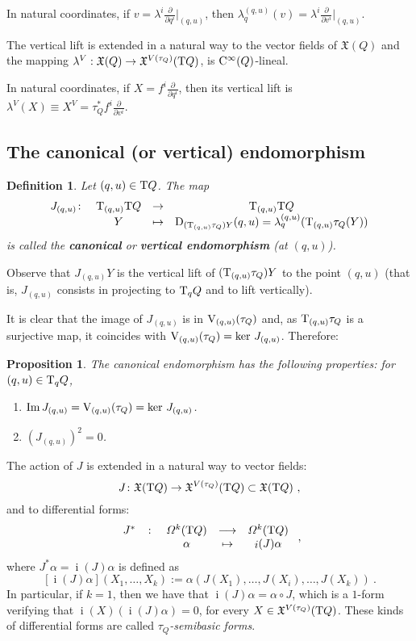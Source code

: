 \documentclass[12pt]{report}
\newtheorem{prop}[teor]{Proposition}
\newtheorem{definition}[teor]{Definition}
\def\ben{\begin{enumerate}}
\def\een{\end{enumerate}}
\def\dst{\displaystyle}
\def\derpar#1#2{\frac{\partial{#1}}{\partial{#2}}}
\def\moment#1#2#3{{#1}_{#2}, \ldots, {#1}_{#3}}
\def\vf{\mathfrak X}
\def\df{{\mit\Omega}}
\def\Tan{{\rm T}}
\def\inn{\mathop{i}\nolimits}
\def\Cinfty{{\rm C}^\infty}
\begin{document}
In natural coordinates, if \(\dst v=\lambda^i\derpar{}{q^i}\Big\vert_{(q,u)}\),
then \(\dst\lambda_q^{(q,u)}(v)=\lambda^i\derpar{}{v^i}\Big\vert_{(q,u)}\).

The vertical lift is extended in a natural way to the vector fields of $\vf(Q)$ and the mapping $\lambda^V:\vf(Q) \to \vf^{V(\tau_Q)}(\Tan Q)$,
is $\Cinfty(Q)$-lineal.

In natural coordinates, if \(\dst X=f^i\derpar{}{q^i}\),
then its vertical lift is
\(\dst\lambda^V(X)\equiv  X^V=\tau^*_Qf^i\derpar{}{v^i}\).


\subsection{The canonical (or vertical) endomorphism}


\begin{definition}
Let $(q,u)\in\Tan Q$. The map
$$
\begin{array}{cccc}
J_{(q,u)} \colon & \Tan_{(q,u)}\Tan Q & \to & \Tan_{(q,u)}\Tan Q
\\
& Y & \mapsto & {\rm D}_{(\Tan_{(q,u)}\tau_Q)Y}(q,u)=
\lambda_q^{(q,u)}(\Tan_{(q,u)}\tau_Q(Y))
\end{array}
$$
is called the \textbf{canonical} or \textbf{vertical endomorphism} (at $(q,u)$).
\end{definition}

Observe that $J_{(q,u)}Y$ is the vertical lift of $(\Tan_{(q,u)}\tau_Q)Y$
to the point $(q,u)$ (that is, $J_{(q,u)}$ consists in projecting
to $\Tan_qQ$ and to lift vertically).

It is clear that the image of $J_{(q,u)}$ is in
${\rm V}_{(q,u)}(\tau_Q)$ and, as $\Tan_{(q,u)}\tau_Q$ is a surjective map,
it coincides with ${\rm V}_{(q,u)}(\tau_Q)=\ker\, J_{(q,u)}$.
Therefore:

\begin{prop}
The canonical endomorphism has the following properties:
for $(q,u)\in\Tan_qQ$,
\ben
\item
${\rm Im}\, J_{(q,u)}={\rm V}_{(q,u)}(\tau_Q)=\ker\, J_{(q,u)}$.
\item
$(J_{(q,u)})^2=0$.
\een
\end{prop}

The action of $J$ is extended in a natural way to vector fields:
$$
J\colon \vf(\Tan Q) \to\vf^{V(\tau_Q)}(\Tan Q)\subset\vf(\Tan Q) \ ,
$$
and to differential forms:
$$\begin{array}{ccccc}
J^*&\colon&\df^k(\Tan Q)&\longrightarrow&\df^k(\Tan Q) \\
 & & \alpha & \mapsto & \inn(J)\alpha
\end{array} \ ,
$$
where $J^*\alpha=\inn(J)\alpha$ is defined as
$$
[\inn(J)\alpha](\moment{X}{1}{k}):=\alpha(J(X_1),\ldots ,
J(X_i),\ldots ,J(X_k)) \ .
$$
In particular, if $k=1$, then we have that 
$\inn(J)\alpha=\alpha\circ J$, which is a
$1$-form verifying that
$\inn(X)(\inn(J)\alpha)=0$, for every $X\in\vf^{V(\tau_Q)}(\Tan Q)$.
These kinds of differential forms are called {\sl $\tau_Q$-semibasic forms}.
\end{document}
